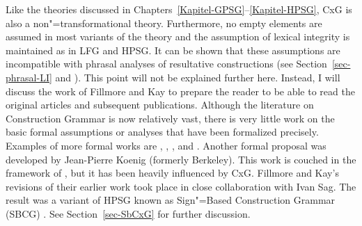 \addlines
Like the theories discussed in Chapters~\ref{Kapitel-GPSG}--\ref{Kapitel-HPSG}, CxG is also a non"=transformational theory.
Furthermore, no empty elements are assumed in most variants of the theory and the assumption of lexical integrity is maintained
 as in LFG and HPSG. 
It can be shown that these assumptions are incompatible with phrasal analyses of resultative constructions (see
Section~\ref{sec-phrasal-LI} and \citealp{Mueller2006d,Mueller2007d}). This point will not be explained further here. Instead, I will discuss the work of Fillmore and Kay to prepare the reader
to be able to read the original articles and subsequent publications. Although the literature on Construction Grammar is now relatively vast, there is very
little work on the basic formal assumptions or analyses that have been formalized precisely.
Examples of more formal works are , \citet{Kay2002a}, , and
. Another formal proposal was developed by Jean-Pierre Koenig
\citeyearpar{Koenig99a} (formerly Berkeley). This work is couched in the framework of \hpsg, but it has been heavily influenced by CxG. Fillmore and Kay's revisions of their earlier work
took place in close collaboration with Ivan Sag. The result was a variant of HPSG known as Sign"=Based Construction Grammar (SBCG) \citep{Sag2010b,Sag2012a}.
See Section~\ref{sec-SbCxG} for further discussion.

